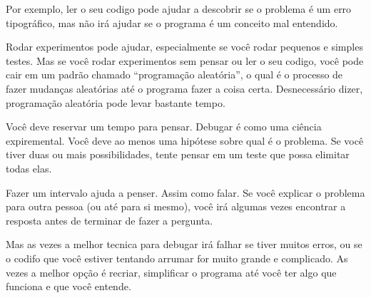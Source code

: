 
Por exemplo, ler o seu codigo pode ajudar a descobrir se o problema é
um erro tipográfico, mas não irá ajudar se o programa é um conceito
mal entendido.


Rodar experimentos pode ajudar, especialmente se você rodar pequenos e
simples testes. Mas se você rodar experimentos sem pensar ou ler o seu
codigo, você pode cair em um padrão chamado ``programação aleatória'',
o qual é o processo de fazer mudanças aleatórias até o programa
fazer a coisa certa. Desnecessário dizer, programação aleatória
pode levar bastante tempo.


Você deve reservar um tempo para pensar. Debugar é como uma ciência
expiremental. Você deve ao menos uma hipótese sobre qual é 
o problema. Se você tiver duas ou mais possibilidades, tente pensar
em um teste que possa elimitar todas elas.

Fazer um intervalo ajuda a penser. Assim como falar. Se você
explicar o problema para outra pessoa (ou até para si mesmo), você
irá algumas vezes encontrar a resposta antes de terminar de fazer a pergunta.

Mas as vezes a melhor tecnica para debugar irá falhar se tiver muitos
erros, ou se o codifo que você estiver tentando arrumar for muito grande
e complicado. As vezes a melhor opção é recriar, simplificar o programa
até você ter algo que funciona e que você entende.

